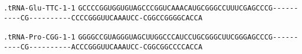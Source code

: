 \documentclass{article}
\newcommand{\rnabox}[1]{\colorbox{#1}{\texttt{#1}}}
\begin{document}
\vspace{-0.5mm}

\texttt{.tRNA-Glu-TTC-1-1}
\rnabox{G}\rnabox{C}\rnabox{C}\rnabox{C}\rnabox{C}\rnabox{G}\rnabox{G}\rnabox{U}\rnabox{G}\rnabox{G}\rnabox{U}\rnabox{G}\rnabox{U}\rnabox{A}\rnabox{G}\rnabox{C}\rnabox{C}\rnabox{C}\rnabox{G}\rnabox{G}\rnabox{U}\rnabox{C}\rnabox{A}\rnabox{A}\rnabox{A}\rnabox{C}\rnabox{A}\rnabox{U}\rnabox{G}\rnabox{C}\rnabox{G}\rnabox{G}\rnabox{G}\rnabox{C}\rnabox{C}\rnabox{U}\rnabox{U}\rnabox{U}\rnabox{C}\rnabox{G}\rnabox{A}\rnabox{G}\rnabox{C}\rnabox{C}\rnabox{C}\rnabox{G}\rnabox{-}\rnabox{-}\rnabox{-}\rnabox{-}\rnabox{-}\rnabox{-}\rnabox{-}\rnabox{-}\rnabox{-}\rnabox{-}\rnabox{C}\rnabox{G}\rnabox{-}\rnabox{-}\rnabox{-}\rnabox{-}\rnabox{-}\rnabox{-}\rnabox{-}\rnabox{-}\rnabox{-}\rnabox{-}\rnabox{C}\rnabox{C}\rnabox{C}\rnabox{C}\rnabox{G}\rnabox{G}\rnabox{G}\rnabox{U}\rnabox{U}\rnabox{C}\rnabox{A}\rnabox{A}\rnabox{A}\rnabox{U}\rnabox{C}\rnabox{C}\rnabox{-}\rnabox{C}\rnabox{G}\rnabox{G}\rnabox{C}\rnabox{C}\rnabox{G}\rnabox{G}\rnabox{G}\rnabox{G}\rnabox{C}\rnabox{A}\rnabox{C}\rnabox{C}\rnabox{A}

\vspace{-0.5mm}

\texttt{.tRNA-Pro-CGG-1-1}
\rnabox{G}\rnabox{G}\rnabox{G}\rnabox{G}\rnabox{C}\rnabox{C}\rnabox{G}\rnabox{U}\rnabox{A}\rnabox{G}\rnabox{G}\rnabox{G}\rnabox{U}\rnabox{A}\rnabox{G}\rnabox{C}\rnabox{U}\rnabox{U}\rnabox{G}\rnabox{G}\rnabox{C}\rnabox{C}\rnabox{C}\rnabox{A}\rnabox{U}\rnabox{C}\rnabox{C}\rnabox{U}\rnabox{G}\rnabox{C}\rnabox{G}\rnabox{G}\rnabox{G}\rnabox{C}\rnabox{U}\rnabox{U}\rnabox{C}\rnabox{G}\rnabox{G}\rnabox{G}\rnabox{A}\rnabox{G}\rnabox{C}\rnabox{C}\rnabox{C}\rnabox{G}\rnabox{-}\rnabox{-}\rnabox{-}\rnabox{-}\rnabox{-}\rnabox{-}\rnabox{-}\rnabox{-}\rnabox{-}\rnabox{-}\rnabox{C}\rnabox{G}\rnabox{-}\rnabox{-}\rnabox{-}\rnabox{-}\rnabox{-}\rnabox{-}\rnabox{-}\rnabox{-}\rnabox{-}\rnabox{-}\rnabox{A}\rnabox{C}\rnabox{C}\rnabox{C}\rnabox{G}\rnabox{G}\rnabox{G}\rnabox{U}\rnabox{U}\rnabox{C}\rnabox{A}\rnabox{A}\rnabox{A}\rnabox{U}\rnabox{C}\rnabox{C}\rnabox{-}\rnabox{C}\rnabox{G}\rnabox{G}\rnabox{C}\rnabox{G}\rnabox{G}\rnabox{C}\rnabox{C}\rnabox{C}\rnabox{C}\rnabox{A}\rnabox{C}\rnabox{C}\rnabox{A}

\vspace{-0.5mm}
\end{document}
